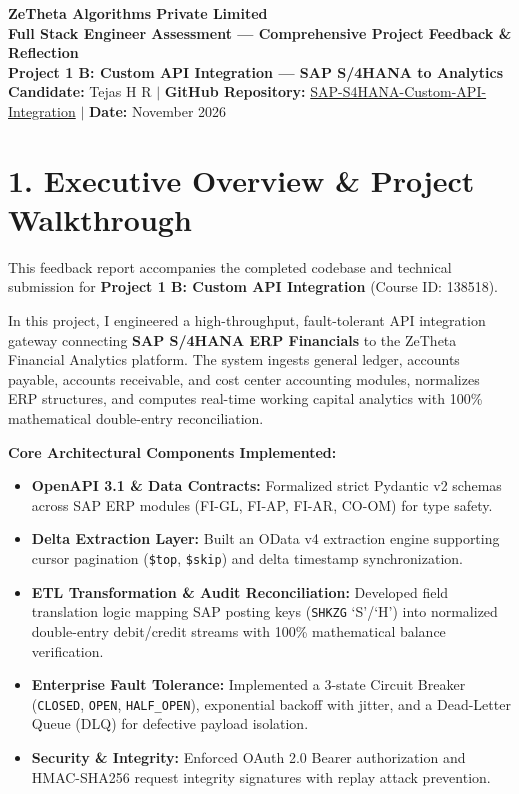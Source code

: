 \documentclass[11pt,a4paper]{article}
\begin{document}
\begin{center}
    {\LARGE \textbf{\color{primary}ZeTheta Algorithms Private Limited}}\\[4pt]
    {\large \textbf{Full Stack Engineer Assessment — Comprehensive Project Feedback \& Reflection}}\\[2pt]
    \textbf{Project 1 B: Custom API Integration — SAP S/4HANA to Analytics}\\[3pt]
    \textbf{Candidate:} Tejas H R \quad $|$ \quad \textbf{GitHub Repository:} \href{https://github.com/tejashr0716/SAP-S4HANA-Custom-API-Integration}{SAP-S4HANA-Custom-API-Integration} \quad $|$ \quad \textbf{Date:} November 2026
\end{center}

\vspace{4pt}

\section{1. Executive Overview \& Project Walkthrough}
This feedback report accompanies the completed codebase and technical submission for \textbf{Project 1 B: Custom API Integration} (Course ID: 138518).

In this project, I engineered a high-throughput, fault-tolerant API integration gateway connecting \textbf{SAP S/4HANA ERP Financials} to the ZeTheta Financial Analytics platform. The system ingests general ledger, accounts payable, accounts receivable, and cost center accounting modules, normalizes ERP structures, and computes real-time working capital analytics with 100\% mathematical double-entry reconciliation.

\textbf{Core Architectural Components Implemented:}
\begin{itemize}[leftmargin=1.5em, itemsep=2pt]
    \item \textbf{OpenAPI 3.1 \& Data Contracts:} Formalized strict Pydantic v2 schemas across SAP ERP modules (FI-GL, FI-AP, FI-AR, CO-OM) for type safety.
    \item \textbf{Delta Extraction Layer:} Built an OData v4 extraction engine supporting cursor pagination (\texttt{\$top}, \texttt{\$skip}) and delta timestamp synchronization.
    \item \textbf{ETL Transformation \& Audit Reconciliation:} Developed field translation logic mapping SAP posting keys (\texttt{SHKZG} `S'/`H') into normalized double-entry debit/credit streams with 100\% mathematical balance verification.
    \item \textbf{Enterprise Fault Tolerance:} Implemented a 3-state Circuit Breaker (\texttt{CLOSED}, \texttt{OPEN}, \texttt{HALF\_OPEN}), exponential backoff with jitter, and a Dead-Letter Queue (DLQ) for defective payload isolation.
    \item \textbf{Security \& Integrity:} Enforced OAuth 2.0 Bearer authorization and HMAC-SHA256 request integrity signatures with replay attack prevention.
\end{itemize}
\end{document}
